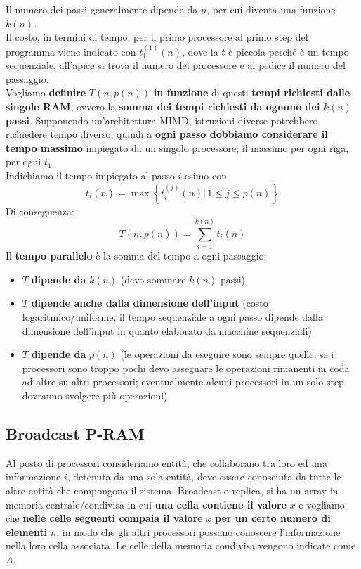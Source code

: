 Il numero dei passi generalmente dipende da $n$, per cui diventa una funzione $k(n)$.\\

Il costo, in termini di tempo, per il primo processore al primo step del programma viene indicato con $t_1^{(1)} (n)$, dove la $t$ è piccola perché è un tempo sequenziale, all'apice si trova il numero del processore e al pedice il numero del passaggio.\\

Vogliamo \textbf{definire} $T(n, p(n))$ \textbf{in funzione} di questi \textbf{tempi richiesti dalle singole RAM}, ovvero la \textbf{somma dei tempi richiesti da ognuno dei $k(n)$ passi}. Supponendo un'architettura MIMD, istruzioni diverse potrebbero richiedere tempo diverso, quindi a \textbf{ogni passo dobbiamo considerare il tempo massimo} impiegato da un singolo processore; il massimo per ogni riga, per ogni $t_1$.\\
Indichiamo il tempo impiegato al passo $i$-esimo con
$$ t_i (n) = \max \left\{ t_i^{(j)} (n) | \, 1 \leq j \leq p(n) \right\}$$
Di conseguenza: 
$$ T\left(n, p(n)\right) = \sum_{i = 1}^{k(n)} t_i (n) $$
Il \textbf{tempo parallelo} è la somma del tempo a ogni passaggio:
\begin{itemize}
	\item $T$ \textbf{dipende da} $k(n)$ (devo sommare $k(n)$ passi)
	\item $T$ \textbf{dipende anche dalla dimensione dell'input} (costo logaritmico/uniforme, il tempo sequenziale a ogni passo dipende dalla dimensione dell'input in quanto elaborato da macchine sequenziali)
	\item $T$ \textbf{dipende da} $p(n)$ (le operazioni da eseguire sono sempre quelle, se i processori sono troppo pochi devo assegnare le operazioni rimanenti in coda ad altre su altri processori; eventualmente alcuni processori in un solo step dovranno svolgere più operazioni)
\end{itemize}

\newpage

\subsection{Broadcast P-RAM}

Al posto di processori consideriamo entità, che collaborano tra loro ed una informazione $i$, detenuta da una sola entità, deve essere conosciuta da tutte le altre entità che compongono il sistema. Broadcast o replica, si ha un array in memoria centrale/condivisa in cui \textbf{una cella contiene il valore} $x$ e vogliamo che \textbf{nelle celle seguenti compaia il valore} $x$ \textbf{per un certo numero di elementi} $n$, in modo che gli altri processori possano conoscere l'informazione nella loro cella associata. Le celle della memoria condivisa vengono indicate come $A$. 

